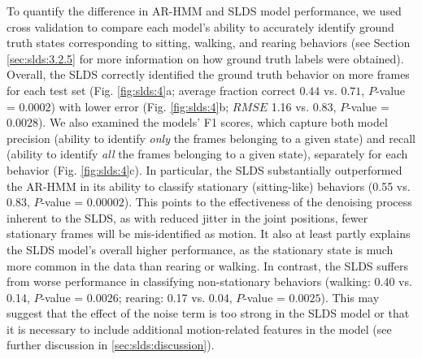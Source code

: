 To quantify the difference in AR-HMM and SLDS model performance, we used cross validation to compare each model's ability to accurately identify ground truth states corresponding to sitting, walking, and rearing behaviors (see Section \ref{sec:slds:3.2.5} for more information on how ground truth labels were obtained). Overall, the SLDS correctly identified the ground truth behavior on more frames for each test set (Fig. \ref{fig:slds:4}a; average fraction correct $0.44$ vs. $0.71$, $P$-value = $0.0002$) with lower error (Fig. \ref{fig:slds:4}b; $RMSE$ 1.16 vs. 0.83, $P$-value = $0.0028$). We also examined the models' F1 scores, which capture both model precision (ability to identify \textit{only} the frames belonging to a given state) and recall (ability to identify \textit{all} the frames belonging to a given state), separately for each behavior (Fig. \ref{fig:slds:4}c). In particular, the SLDS substantially outperformed the AR-HMM in its ability to classify stationary (sitting-like) behaviors (0.55 vs. 0.83, $P$-value = $0.00002$). This points to the effectiveness of the denoising process inherent to the SLDS, as with reduced jitter in the joint positions, fewer stationary frames will be mis-identified as motion. It also at least partly explains the SLDS model's overall higher performance, as the stationary state is much more common in the data than rearing or walking. In contrast, the SLDS suffers from worse performance in classifying non-stationary behaviors (walking: 0.40 vs. 0.14, $P$-value = $0.0026$; rearing: 0.17 vs. 0.04, $P$-value = $0.0025$). This may suggest that the effect of the noise term is too strong in the SLDS model or that it is necessary to include additional motion-related features in the model (see further discussion in \ref{sec:slds:discussion}). 